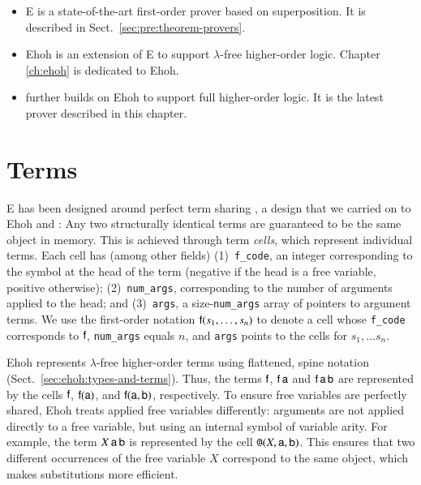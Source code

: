 \begin{itemize}
  \item E is a state-of-the-art first-order prover based on superposition. It is described in
  Sect.~\ref{sec:pre:theorem-provers}.
  \item Ehoh is an extension of E to support $\lambda$-free higher-order logic. Chapter \ref{ch:ehoh}
  is dedicated to Ehoh.
  \item \ehohii{} further builds on Ehoh to support full higher-order logic. It is the latest prover
  described in this chapter.
\end{itemize}

\section{Terms}
\label{sec:ehoh2:terms}

E has been designed around perfect term sharing %
\cite{ls-01-shared}, a design that we carried on to  Ehoh and \ehohii{}: Any two structurally identical terms are
guaranteed to be the same object in memory. This is achieved through term
\emph{cells}, which represent individual terms. Each cell has (among other fields)
(1)~\texttt{f\_code}, an integer corresponding to the symbol at the head of the term (negative
if the head is a free variable, positive otherwise); (2)~\texttt{num\_args},
corresponding to the number of arguments applied to the head; and (3)~\texttt{args},
a size-\texttt{num\_args} array of pointers to argument terms. We
use the first-order notation $\mathsf{f}(s_1, \ldots, s_n)$ to denote a cell whose
\texttt{f\_code} corresponds to $\mathsf{f}$, \texttt{num\_args} equals $n$, and
\texttt{args} points to the cells for $s_1, \ldots s_n$.

Ehoh represents $\lambda$-free higher-order terms using flattened, spine notation
(Sect.~\ref{sec:ehoh:types-and-terms}).
Thus, the terms $\mathsf{f}$, $\mathsf{f} \, \mathsf{a}$ and $\mathsf{f} \, \mathsf{a} \,
\mathsf{b}$ are represented by the cells $\mathsf{f}$,
$\mathsf{f}(\mathsf{a})$, and $\mathsf{f}(\mathsf{a}, \mathsf{b})$, respectively.
To ensure free variables are
perfectly shared, Ehoh treats applied free variables differently: arguments are
not applied directly to a free variable, but using an internal symbol
\internalat{} of variable arity. For example, the term $X \, \mathsf{a} \, \mathsf{b}$ is
represented by the cell $\texttt{@}(X, \mathsf{a}, \mathsf{b})$. This ensures that
two different occurrences of the free variable $X$ correspond to the same object,
which makes substitutions more efficient.

